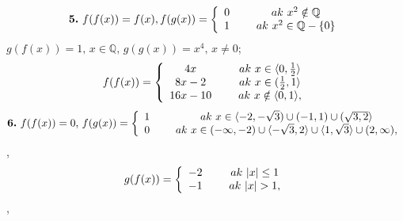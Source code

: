 \begin{align*} 
\boldsymbol{5.}\ f(f(x))= f(x), f(g(x))= \left\{ \begin{array}{cc} 
                0 & \hspace{5mm} ak\ x^{2} \notin \mathbb{Q} \\
                1 & \hspace{5mm} ak\ x^{2} \in \mathbb{Q}-\lbrace0\rbrace \\
                \end{array} \right.
\end{align*}
$ g(f(x))=1, \, x \in \mathbb{Q}, \, g(g(x))=x^{4}, \, x \ne 0 $;
\begin{align*} 
  f(f(x))= \left\{ \begin{array}{cc} 
                4x & \hspace{5mm} ak\ x \in \langle0, \frac{1}{2}\rangle \\
                8x-2 & \hspace{5mm} ak\ x \in ( \frac{1}{2},1\rangle \\
                16x-10 & \hspace{5mm} ak\ x \notin \langle0,1\rangle , \\
                \end{array} \right.
\end{align*}
\begin{align*} 
\boldsymbol{6.}\ f(f(x))= 0, \, f(g(x))= \left\{ \begin{array}{cc} 
                1 & \hspace{5mm} ak\ x \in \langle -2, -\sqrt{3} ) \cup (-1,1) \cup ( \sqrt{3, 2}\rangle \\
                0 & \hspace{5mm} ak\ x \in ( - \infty, -2) \cup \langle - \sqrt{3},2\rangle \cup \langle1, \sqrt{3}\rangle \cup (2, \infty), \\
                \end{array} \right.
\end{align*}, 
\begin{align*} 
g(f(x))= \left\{ \begin{array}{cc} 
                -2 & \hspace{5mm} ak\ \vert x \vert\leq 1  \\
                -1 & \hspace{5mm} ak\ \vert x \vert > 1 , \\
                \end{array} \right.
\end{align*}, 
